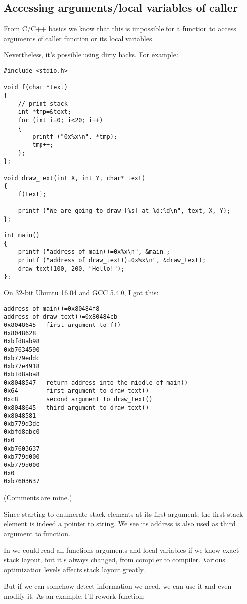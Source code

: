 \subsection{Accessing arguments/local variables of caller}

From C/C++ basics we know that this is impossible for a function to access arguments of caller function or its
local variables.

Nevertheless, it's possible using dirty hacks.
For example:

\begin{lstlisting}[style=customc]
#include <stdio.h>

void f(char *text)
{
	// print stack
	int *tmp=&text;
	for (int i=0; i<20; i++)
	{
		printf ("0x%x\n", *tmp);
		tmp++;
	};
};

void draw_text(int X, int Y, char* text)
{
	f(text);

	printf ("We are going to draw [%s] at %d:%d\n", text, X, Y);
};

int main()
{
	printf ("address of main()=0x%x\n", &main);
	printf ("address of draw_text()=0x%x\n", &draw_text);
	draw_text(100, 200, "Hello!");
};
\end{lstlisting}

On 32-bit Ubuntu 16.04 and GCC 5.4.0, I got this:

\begin{lstlisting}
address of main()=0x80484f8
address of draw_text()=0x80484cb
0x8048645	first argument to f()
0x8048628
0xbfd8ab98
0xb7634590
0xb779eddc
0xb77e4918
0xbfd8aba8
0x8048547	return address into the middle of main()
0x64		first argument to draw_text()
0xc8		second argument to draw_text()
0x8048645	third argument to draw_text()
0x8048581
0xb779d3dc
0xbfd8abc0
0x0
0xb7603637
0xb779d000
0xb779d000
0x0
0xb7603637
\end{lstlisting}

(Comments are mine.)

Since  starting to enumerate stack elements at its first argument, the first stack element is indeed a pointer
to  string. We see its address is also used as third argument to  function.

In  we could read all functions arguments and local variables if we know exact stack layout, but it's always
changed, from compiler to compiler.
Various optimization levels affects stack layout greatly.

But if we can somehow detect information we need, we can use it and even modify it.
As an example, I'll rework  function:

